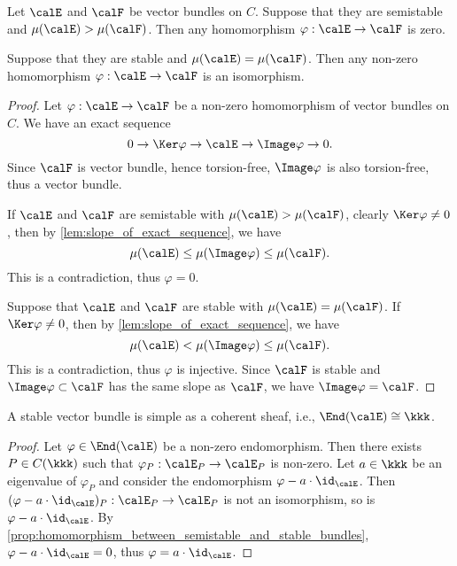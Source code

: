     \begin{proposition}\label{prop:homomorphism_between_semistable_and_stable_bundles}
        Let \(\calE\) and \(\calF\) be vector bundles on \(C\).
        Suppose that they are semistable and \(\mu(\calE) > \mu(\calF)\).
        Then any homomorphism \(\varphi : \calE \to \calF\) is zero.

        Suppose that they are stable and \(\mu(\calE) = \mu(\calF)\).
        Then any non-zero homomorphism \(\varphi : \calE \to \calF\) is an isomorphism.
    \end{proposition}
    \begin{proof}
        Let \(\varphi : \calE \to \calF\) be a non-zero homomorphism of vector bundles on \(C\).
        We have an exact sequence
        \[ 0 \to \Ker \varphi \to \calE \to \Image \varphi \to 0. \]
        Since \(\calF\) is vector bundle, hence torsion-free, \(\Image \varphi\) is also torsion-free, thus a vector bundle.

        If \(\calE\) and \(\calF\) are semistable with \(\mu(\calE) > \mu(\calF)\), 
        clearly \(\Ker \varphi \neq 0\), then by \cref{lem:slope_of_exact_sequence}, we have
        \[ \mu(\calE) \leq \mu(\Image \varphi) \leq \mu(\calF). \]
        This is a contradiction, thus \(\varphi = 0\).

        Suppose that \(\calE\) and \(\calF\) are stable with \(\mu(\calE) = \mu(\calF)\).
        If \(\Ker \varphi \neq 0\), then by \cref{lem:slope_of_exact_sequence}, we have
        \[ \mu(\calE) < \mu(\Image \varphi) \leq \mu(\calF). \]
        This is a contradiction, thus \(\varphi\) is injective.
        Since \(\calF\) is stable and \(\Image \varphi \subset \calF\) has the same slope as \(\calF\), we have \(\Image \varphi = \calF\).
    \end{proof}

    \begin{corollary}\label{cor:stable_vector_bundles_are_simple}
        A stable vector bundle is simple as a coherent sheaf, i.e., \(\End(\calE) \cong \kkk\).
    \end{corollary}
    \begin{proof}
        Let \(\varphi \in \End(\calE)\) be a non-zero endomorphism.
        Then there exists \(P \in C(\kkk)\) such that \(\varphi_P : \calE_P \to \calE_P\) is non-zero.
        Let \(a \in \kkk\) be an eigenvalue of \(\varphi_P\) and consider the endomorphism \(\varphi - a \cdot \id_\calE\).
        Then \((\varphi - a \cdot \id_\calE)_P : \calE_P \to \calE_P\) is not an isomorphism, so is \(\varphi - a \cdot \id_\calE\).
        By \cref{prop:homomorphism_between_semistable_and_stable_bundles}, \(\varphi - a \cdot \id_\calE = 0\), thus \(\varphi = a \cdot \id_\calE\).
    \end{proof}

